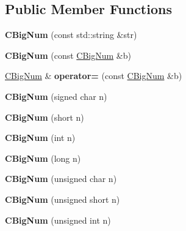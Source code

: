 \subsection*{Public Member Functions}
\begin{DoxyCompactItemize}
\item 
\mbox{\label{class_c_big_num_a250bd7117bd7fa99bbd53f496f76058e}} 
{\bfseries C\+Big\+Num} (const std\+::string \&str)
\item 
\mbox{\label{class_c_big_num_a50fcecb7d672c2b7d0a89e641a0682ca}} 
{\bfseries C\+Big\+Num} (const \mbox{\hyperlink{class_c_big_num}{C\+Big\+Num}} \&b)
\item 
\mbox{\label{class_c_big_num_a575e705d2120b0a43d74d798eaef48ee}} 
\mbox{\hyperlink{class_c_big_num}{C\+Big\+Num}} \& {\bfseries operator=} (const \mbox{\hyperlink{class_c_big_num}{C\+Big\+Num}} \&b)
\item 
\mbox{\label{class_c_big_num_a318644830d41471cd2bbcd702975bbb1}} 
{\bfseries C\+Big\+Num} (signed char n)
\item 
\mbox{\label{class_c_big_num_a0f4e34dcc48e9089e9f20c06418755c9}} 
{\bfseries C\+Big\+Num} (short n)
\item 
\mbox{\label{class_c_big_num_a930e53591ce24f650f7ddd1076bd4efe}} 
{\bfseries C\+Big\+Num} (int n)
\item 
\mbox{\label{class_c_big_num_a96ef554f3153f676125a49889303cf31}} 
{\bfseries C\+Big\+Num} (long n)
\item 
\mbox{\label{class_c_big_num_afe63a4eb433e69687fad44193390dc1b}} 
{\bfseries C\+Big\+Num} (unsigned char n)
\item 
\mbox{\label{class_c_big_num_a3745ad1eb1bd53c9535f8620515d3ae3}} 
{\bfseries C\+Big\+Num} (unsigned short n)
\item 
\mbox{\label{class_c_big_num_a87ff912ff941f4bc4ba10482c502757d}} 
{\bfseries C\+Big\+Num} (unsigned int n)
\item 

\end{DoxyCompactItemize}
